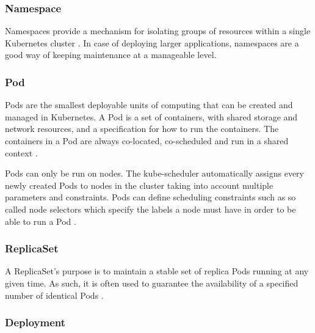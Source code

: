 \subsubsection{Namespace}

Namespaces provide a mechanism for isolating groups of resources within a single Kubernetes cluster \cite{KubernetesNamespace}. In case of deploying larger applications, namespaces are a good way of keeping maintenance at a manageable level.

\subsubsection{Pod} \label{k8s-pod}

Pods are the smallest deployable units of computing that can be created and managed in Kubernetes. A Pod is a set of containers, with shared storage and network resources, and a specification for how to run the containers. The containers in a Pod are always co-located, co-scheduled and run in a shared context \cite{KubernetesPod}.

Pods can only be run on nodes. The kube-scheduler automatically assigns every newly created Pods to nodes in the cluster taking into account multiple parameters and constraints. Pods can define scheduling constraints such as so called node selectors which specify the labels a node must have in order to be able to run a Pod \cite{KubernetesNodeSelector}.

\subsubsection{ReplicaSet}

A ReplicaSet's purpose is to maintain a stable set of replica Pods running at any given time. As such, it is often used to guarantee the availability of a specified number of identical Pods \cite{KubernetesReplicaSet}.

\subsubsection{Deployment}

